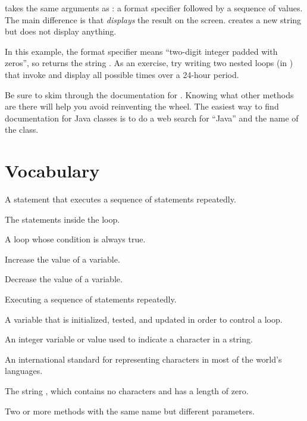
 takes the same arguments as : a format specifier followed by a sequence of values.
The main difference is that  {\em displays} the result on the screen.
 creates a new string but does not display anything.

In this example, the format specifier  means ``two-digit integer padded with zeros'', so  returns the string .
As an exercise, try writing two nested  loops (in ) that invoke  and display all possible times over a 24-hour period.

Be sure to skim through the documentation for .
Knowing what other methods are there will help you avoid reinventing the wheel.
The easiest way to find documentation for Java classes is to do a web search for ``Java'' and the name of the class.


\section{Vocabulary}

\begin{description}

A statement that executes a sequence of statements repeatedly.

The statements inside the loop.

A loop whose condition is always true.

Increase the value of a variable.

Decrease the value of a variable.

Executing a sequence of statements repeatedly.

A variable that is initialized, tested, and updated in order to control a loop.

An integer variable or value used to indicate a character in a string.

An international standard for representing characters in most of the world's languages.

The string , which contains no characters and has a length of zero.

Two or more methods with the same name but different parameters.

\end{description}


